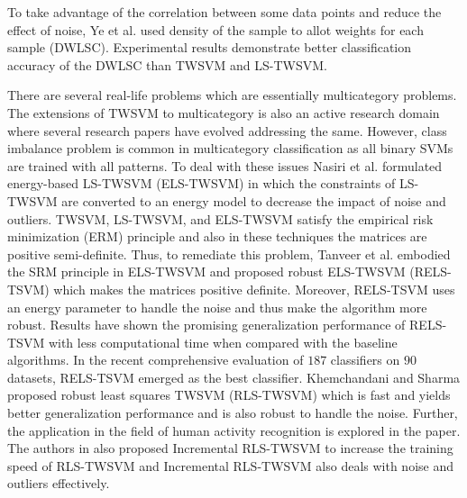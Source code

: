 \documentclass[pdflatex,sn-mathphys]{sn-jnl}%
\theoremstyle{thmstyleone}%
\theoremstyle{thmstyletwo}%
\theoremstyle{thmstylethree}%
\begin{document}
To take advantage of the correlation between some data points and reduce the effect of noise, Ye et al. \cite{ye2012density} used density of the sample to allot weights for each sample (DWLSC). Experimental results demonstrate better classification accuracy of the DWLSC than TWSVM and LS-TWSVM.

There are several real-life problems which are essentially multicategory problems. The extensions of TWSVM to multicategory is also an active research domain where several research papers have evolved addressing the same. However, class imbalance problem is common in multicategory classification as all binary SVMs are trained with all patterns. To deal with these issues Nasiri et al. \cite{nasiri2014energy} formulated energy-based LS-TWSVM (ELS-TWSVM) in which the constraints of LS-TWSVM are converted to an energy model to decrease the impact of noise and outliers. TWSVM, LS-TWSVM, and ELS-TWSVM satisfy the empirical risk minimization (ERM) principle and also in these techniques the matrices are positive semi-definite. Thus, to remediate this problem, Tanveer et al. \cite{tanveer2016robust} embodied the SRM principle in ELS-TWSVM and proposed robust ELS-TWSVM (RELS-TSVM) which makes the matrices positive definite. Moreover, RELS-TSVM uses an energy parameter to handle the noise and thus make the algorithm more robust. 
Results have shown the promising generalization performance of RELS-TSVM with less computational time when compared with the baseline algorithms. In the recent comprehensive evaluation \cite{tanveer2019comprehensive} of $187$ classifiers on $90$ datasets, RELS-TSVM \cite{tanveer2016robust} emerged as the best classifier. Khemchandani and Sharma \cite{khemchandani2016robust} proposed robust least squares TWSVM (RLS-TWSVM)  which is fast and yields better generalization performance and is also robust to handle the noise. Further, the application in the field of human activity recognition is explored in the paper. The authors in \cite{khemchandani2016robust} also proposed Incremental RLS-TWSVM to increase the training speed of RLS-TWSVM and Incremental RLS-TWSVM also deals with noise and outliers effectively.
\end{document}
